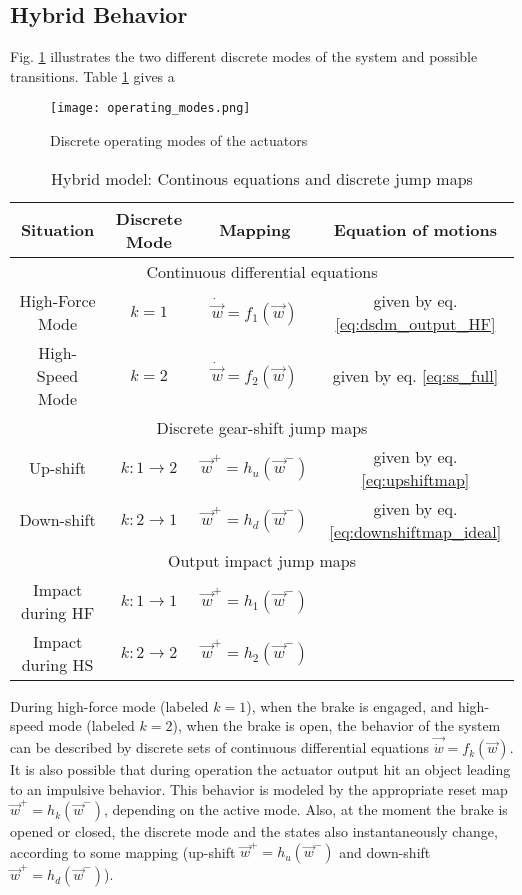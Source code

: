 \newpage
\subsection{Hybrid Behavior}

Fig. \ref{fig:operatingmodes} illustrates the two different discrete modes of the system and possible transitions. Table \ref{tab:hybrid} gives a  
%
\begin{figure}[H]
	\centering
		\texttt{[image: operating\_modes.png]}
	\caption{Discrete operating modes of the actuators}
	\label{fig:operatingmodes}
\end{figure}
%
\begin{table}[H]
	\centering
	\caption{Hybrid model: Continous equations and discrete jump maps}	%
		\begin{tabular}{ c c c c }
				\hline \hline
				Situation           & Discrete Mode     & Mapping   & Equation of motions \\
				\hline \hline
				\multicolumn{4}{c}{ Continuous differential equations }\\
        \hline
			   High-Force Mode    & $k=1$             & $\dot{\vec{w}} = f_1(\vec{w})$  & given by eq. \eqref{eq:dsdm_output_HF} \\
				 High-Speed Mode    & $k=2$             & $\dot{\vec{w}} = f_2(\vec{w})$  & given by eq. \eqref{eq:ss_full}             \\
				\hline
				\multicolumn{4}{c}{ Discrete gear-shift jump maps }\\
				\hline
				 Up-shift           & $k:1\rightarrow2$  & $\vec{w}^+= h_u(\vec{w}^-)$  &  given by eq. \eqref{eq:upshiftmap}\\
				 Down-shift         & $k:2\rightarrow1$  & $\vec{w}^+= h_d(\vec{w}^-)$  &  given by eq. \eqref{eq:downshiftmap_ideal}\\
				\hline
				\multicolumn{4}{c}{ Output impact jump maps }\\
				\hline
				 Impact during HF   & $k:1\rightarrow1$  & $\vec{w}^+= h_1(\vec{w}^-)$  &  \\
				 Impact during HS   & $k:2\rightarrow2$  & $\vec{w}^+= h_2(\vec{w}^-)$  &  \\
		    \hline \hline
        \end{tabular}		
	\label{tab:hybrid}
\end{table}
%
During high-force mode (labeled $k=1$), when the brake is engaged, and high-speed mode (labeled $k=2$), when the brake is open, the behavior of the system can be described by discrete sets of continuous differential equations $\vec{\dot{w}}=f_k( \vec{w} )$. It is also possible that during operation the actuator output hit an object leading to an impulsive behavior. This behavior is modeled by the appropriate reset map $\vec{w}^+=h_k( \vec{w}^- )$, depending on the active mode. Also, at the moment the brake is opened or closed, the discrete mode and the states also instantaneously change, according to some mapping (up-shift $\vec{w}^+=h_u( \vec{w}^- )$ and down-shift $\vec{w}^+=h_d( \vec{w}^- )$).


